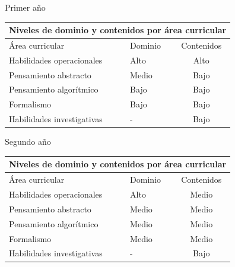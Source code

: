 ﻿\newpage
Primer año

\begin{table}[H]
\begin{center}
\begin{tabular}{|ccc|}
\hline
\multicolumn{3}{|c|}{\cellcolor[HTML]{00C0F3} \textbf{Niveles de dominio y contenidos por área curricular}} \\ \hline
\multicolumn{1}{|l|}{Área curricular} & \multicolumn{1}{l|}{Dominio} & Contenidos \\ \hline
\multicolumn{1}{|l|}{Habilidades operacionales} & \multicolumn{1}{l|}{Alto} & Alto \\ \hline
\multicolumn{1}{|l|}{Pensamiento abstracto} & \multicolumn{1}{l|}{Medio} & Bajo \\ \hline
\multicolumn{1}{|l|}{Pensamiento algorítmico} & \multicolumn{1}{l|}{Bajo} & Bajo \\ \hline
\multicolumn{1}{|l|}{Formalismo} & \multicolumn{1}{l|}{Bajo} & Bajo \\ \hline
\multicolumn{1}{|l|}{Habilidades investigativas} & \multicolumn{1}{l|}{-} & Bajo \\ \hline
\end{tabular}
\end{center}
\end{table}

Segundo año

\begin{table}[H]
\begin{center}
\begin{tabular}{|ccc|}
\hline
\multicolumn{3}{|c|}{\cellcolor[HTML]{00C0F3} \textbf{Niveles de dominio y contenidos por área curricular}} \\ \hline
\multicolumn{1}{|l|}{Área curricular} & \multicolumn{1}{l|}{Dominio} & Contenidos \\ \hline
\multicolumn{1}{|l|}{Habilidades operacionales} & \multicolumn{1}{l|}{Alto} & Medio \\ \hline
\multicolumn{1}{|l|}{Pensamiento abstracto} & \multicolumn{1}{l|}{Medio} & Medio \\ \hline
\multicolumn{1}{|l|}{Pensamiento algorítmico} & \multicolumn{1}{l|}{Medio} & Medio \\ \hline
\multicolumn{1}{|l|}{Formalismo} & \multicolumn{1}{l|}{Medio} & Medio \\ \hline
\multicolumn{1}{|l|}{Habilidades investigativas} & \multicolumn{1}{l|}{-} & Bajo \\ \hline
\end{tabular}
\end{center}
\end{table}

